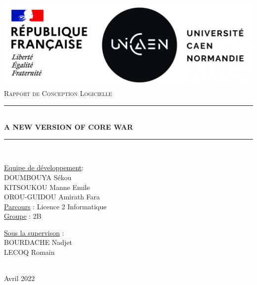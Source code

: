 \documentclass[12pt]{article}
\newcommand{\HRule}{\rule{\linewidth}{0.5mm}}
\begin{document}
\begin{titlepage}
	\begin{center}
		\includegraphics[scale=0.2]{Images/logos-Marianne-UNICAEN-scaled.jpg}\\[1.5cm]

		\textsc{\Large Rapport de Conception Logicielle}\\[1.5cm]

		\HRule \\[0.4cm]
		{
		\LARGE \bfseries A NEW VERSION OF CORE WAR \\[0.2cm]
		}
		\HRule \\[0.5cm]
	\end{center}

	\begin{minipage}[c]{0.5\linewidth}
		\begin{flushleft}
			\underline{Equipe de développement}: \\[0.5cm]
			DOUMBOUYA Sékou\\[0.2cm]
			KITSOUKOU Manne Emile\\[0.2cm]
			OROU-GUIDOU Amirath Fara\\[0.5cm]
			\underline{Parcours} : Licence 2 Informatique\\[0.2cm]
			\underline{Groupe} : 2B\\
		\end{flushleft}
	\end{minipage}

	\begin{minipage}[c]{\linewidth}
		\begin{flushright}
			\underline{Sous la supervison} :\\[0.5cm]
			BOURDACHE Nadjet \\[0.2cm]
			LECOQ Romain
		\end{flushright}
	\end{minipage}\\[0.7cm]

	\center Avril 2022
\end{titlepage}
\end{document}
